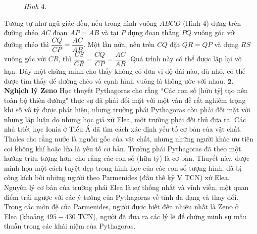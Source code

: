 \begin{multicols}{2}
\begin{figure}[H]
		\caption{\small\textit{\color{lichsutoanhoc}Hình $4$.}}
		\vspace*{-5pt}
	\end{figure}
	Tương tự như ngũ giác đều, nếu trong hình vuông $ABCD$ (Hình $4$) dựng trên đường chéo $AC$ đoạn $AP = AB$  và tại $P$ dựng đoạn thẳng $PQ$  vuông góc với đường chéo thì $\dfrac{CQ}{CP} = \dfrac{AC}{AB}$. Một lần nữa, nếu trên $CQ$  đặt $QR = QP$ và  dựng $RS$  vuông góc với $CR$,  thì  $\dfrac{CS}{CR} = \dfrac{CQ}{CP} = \dfrac{AC}{AB}$. Quá trình này có thể được lặp lại vô hạn. Đây một chứng minh cho thấy không có đơn vị độ dài nào, dù nhỏ, có thể được tìm thấy để đường chéo và cạnh hình vuông là thông ước với nhau.
	\vskip 0.1cm
	\vskip 0.1cm
	$\pmb{2.}$ \textbf{\color{lichsutoanhoc}Nghịch lý Zeno}
	\vskip 0.1cm
	Học thuyết Pythagoras cho rằng ``Các con số [hữu tỷ] tạo nên toàn bộ thiên đường" thực sự đã phải đối mặt với một vấn đề rất nghiêm trọng khi số vô tỷ được phát hiện, nhưng trường phái Pythagoras còn phải đối mặt với những lập luận do những học giả xứ Elea, một trường phái đối thủ đưa ra. 
	\vskip 0.1cm
	Các nhà triết học Ionia ở Tiểu Á đã tìm cách xác định yếu tố cơ bản của vật chất.
	\vskip 0.1cm
	Thales cho rằng nước là nguồn gốc của vật chất, nhưng những người khác ưu tiên coi không khí hoặc lửa là yếu tố cơ bản. Trường phái Pythagoras đã theo một hướng trừu tượng hơn: cho rằng các con số (hữu tỷ) là cơ bản. Thuyết này, được minh họa một cách tuyệt đẹp trong hình học của các con số tượng hình, đã bị công kích bởi những người theo Parmenides (đầu thế kỷ V TCN) xứ Elea. Nguyên lý cơ bản của trường phái Elea là sự thống nhất và vĩnh viễn, một quan điểm trái ngược với các ý tưởng của Pythagoras về tính đa dạng và thay đổi.  Trong các môn đệ của Parmenides, người được biết đến nhiều nhất là Zeno ở Elea (khoảng $495-430$ TCN), người đã đưa ra các lý lẽ để chứng minh sự mâu thuẫn trong các khái niệm của Pythagoras.

\end{multicols}
